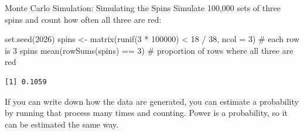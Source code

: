 \documentclass[
  ignorenonframetext,
  aspectratio=169,
]{beamer}
\newenvironment{Shaded}{\begin{snugshade}}{\end{snugshade}}
\newcommand{\AttributeTok}[1]{\textcolor[rgb]{0.40,0.45,0.13}{#1}}
\newcommand{\CommentTok}[1]{\textcolor[rgb]{0.37,0.37,0.37}{#1}}
\newcommand{\DecValTok}[1]{\textcolor[rgb]{0.68,0.00,0.00}{#1}}
\newcommand{\FunctionTok}[1]{\textcolor[rgb]{0.28,0.35,0.67}{#1}}
\newcommand{\NormalTok}[1]{\textcolor[rgb]{0.00,0.23,0.31}{#1}}
\newcommand{\OtherTok}[1]{\textcolor[rgb]{0.00,0.23,0.31}{#1}}
\newcommand{\SpecialCharTok}[1]{\textcolor[rgb]{0.37,0.37,0.37}{#1}}
\begin{document}
\begin{frame}[fragile]{Monte Carlo Simulation: Simulating the Spins}
\label{monte-carlo-simulation-simulating-the-spins}
Simulate 100,000 sets of three spins and count how often all three are
red:

\begin{Shaded}
\begin{Highlighting}[]
\FunctionTok{set.seed}\NormalTok{(}\DecValTok{2026}\NormalTok{)}
\NormalTok{spins }\OtherTok{\textless{}{-}} \FunctionTok{matrix}\NormalTok{(}\FunctionTok{runif}\NormalTok{(}\DecValTok{3} \SpecialCharTok{*} \DecValTok{100000}\NormalTok{) }\SpecialCharTok{\textless{}} \DecValTok{18} \SpecialCharTok{/} \DecValTok{38}\NormalTok{, }\AttributeTok{ncol =} \DecValTok{3}\NormalTok{) }\CommentTok{\# each row is 3 spins}
\FunctionTok{mean}\NormalTok{(}\FunctionTok{rowSums}\NormalTok{(spins) }\SpecialCharTok{==} \DecValTok{3}\NormalTok{) }\CommentTok{\# proportion of rows where all three are red}
\end{Highlighting}
\end{Shaded}

\begin{verbatim}
[1] 0.1059
\end{verbatim}

\vspace{0.6em}

\begin{center}
\small If you can write down how the data are generated, you can estimate a probability by running that process many times and counting. Power is a probability, so it can be estimated the same way.
\end{center}
\end{frame}
\end{document}
